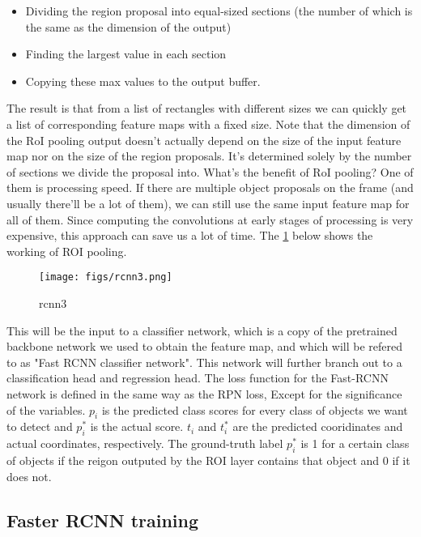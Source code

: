 \begin{itemize}
	\item Dividing the region proposal into equal-sized sections (the number of which is the same as the dimension of the output)
	\item Finding the largest value in each section
	\item Copying these max values to the output buffer.
\end{itemize}

The result is that from a list of rectangles with different sizes we can quickly get a list of corresponding feature maps with a fixed size. Note that the dimension of the RoI pooling output doesn’t actually depend on the size of the input feature map nor on the size of the region proposals. It’s determined solely by the number of sections we divide the proposal into. What’s the benefit of RoI pooling? One of them is processing speed. If there are multiple object proposals on the frame (and usually there’ll be a lot of them), we can still use the same input feature map for all of them. Since computing the convolutions at early stages of processing is very expensive, this approach can save us a lot of time. The \cref{fig:rcnn3} below shows the working of ROI pooling.

\begin{figure}[!htpb]
	\centering
	\texttt{[image: figs/rcnn3.png]}
	\caption{rcnn3}\label{fig:rcnn3}
\end{figure}

This will be the input to a classifier network, which is a copy of the pretrained backbone network we used to obtain the feature map, and which will be refered to as "Fast RCNN classifier network". This network will further branch out to a classification head and regression head. The loss function for the Fast-RCNN network is defined in the same way as the RPN loss, Except for the significance of the variables. $p_{i}$ is the predicted class scores for every class of objects we want to detect and $p_{i}^*$ is the actual score. $t_{i}$ and $t_{i}^*$ are the predicted cooridinates and actual coordinates, respectively. The ground-truth label $p_{i}^*$ is 1 for a certain class of objects if the reigon outputed by the ROI layer contains that object and 0 if it does not.

\subsection{Faster RCNN training}

